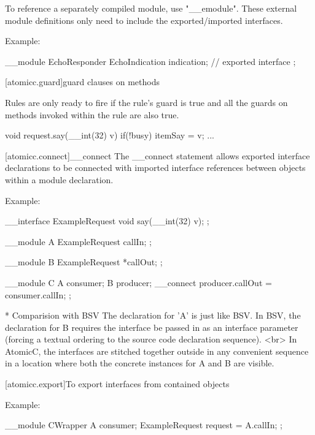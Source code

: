 To reference a separately compiled module, use "__emodule".  These external
module definitions only need to include the exported/imported interfaces.

Example:
\begin{codeblock}
     __module EchoResponder {
         EchoIndication   indication;           // exported interface
     };
\end{codeblock}

[atomicc.guard]{guard clauses on methods}

Rules are only ready to fire if the rule's guard is true and all the
guards on methods invoked within the rule are also true.

\begin{codeblock}
         void request.say(__int(32) v) if(!busy) {
             itemSay = v;
             ...
         }
\end{codeblock}

[atomicc.connect]{__connect}
The __connect statement allows exported interface declarations to be connected
with imported interface references between objects within a module declaration.

Example:
\begin{codeblock}
     __interface ExampleRequest {
         void say(__int(32) v);
     };

     __module A {
          ExampleRequest callIn;
     };

     __module B {
         ExampleRequest *callOut;
     };

     __module C {
         A consumer;
         B producer;
         __connect producer.callOut = consumer.callIn;
     };
\end{codeblock}

* Comparision with BSV
    The declaration for 'A' is just like BSV.
    In BSV, the declaration for B requires the interface be passed in as
    an interface parameter (forcing a textual ordering to the source code
    declaration sequence).
    <br>
    In AtomicC, the interfaces are stitched together outside in any
    convenient sequence in a location where both the concrete instances
    for A and B are visible.

[atomicc.export]{To export interfaces from contained objects}

Example:
\begin{codeblock}
     __module CWrapper {
         A consumer;
         ExampleRequest request = A.callIn;
      };
\end{codeblock}

